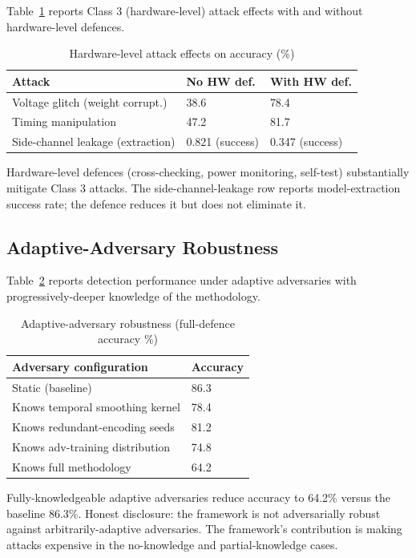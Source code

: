 \documentclass[sigconf,nonacm]{acmart}
\begin{document}
Table~\ref{tab:hwattack} reports Class 3 (hardware-level) attack
effects with and without hardware-level defences.

\begin{table}[h]
\caption{Hardware-level attack effects on accuracy (\%)}
\label{tab:hwattack}
\small
\begin{tabularx}{\columnwidth}{@{}p{2.6cm}X X@{}}
\toprule
\textbf{Attack} & \textbf{No HW def.} & \textbf{With HW def.} \\
\midrule
Voltage glitch (weight corrupt.) & 38.6 & 78.4 \\
Timing manipulation              & 47.2 & 81.7 \\
Side-channel leakage (extraction)& 0.821 (success) & 0.347 (success) \\
\bottomrule
\end{tabularx}
\end{table}

Hardware-level defences (cross-checking, power monitoring,
self-test) substantially mitigate Class 3 attacks. The
side-channel-leakage row reports model-extraction success rate;
the defence reduces it but does not eliminate it.

\subsection{Adaptive-Adversary Robustness}

Table~\ref{tab:adaptive} reports detection performance under
adaptive adversaries with progressively-deeper knowledge of the
methodology.

\begin{table}[h]
\caption{Adaptive-adversary robustness (full-defence accuracy \%)}
\label{tab:adaptive}
\small
\begin{tabularx}{\columnwidth}{@{}p{3.4cm}X@{}}
\toprule
\textbf{Adversary configuration} & \textbf{Accuracy} \\
\midrule
Static (baseline)                & 86.3 \\
Knows temporal smoothing kernel  & 78.4 \\
Knows redundant-encoding seeds   & 81.2 \\
Knows adv-training distribution  & 74.8 \\
Knows full methodology           & 64.2 \\
\bottomrule
\end{tabularx}
\end{table}

Fully-knowledgeable adaptive adversaries reduce accuracy to 64.2\%
versus the baseline 86.3\%. Honest disclosure: the framework is
not adversarially robust against arbitrarily-adaptive adversaries.
The framework's contribution is making attacks expensive in the
no-knowledge and partial-knowledge cases.
\end{document}
